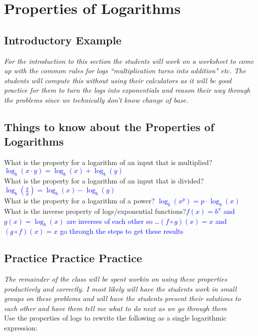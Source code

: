 \documentclass[11pt]{scrartcl}
\theoremstyle{definition}
\begin{document}

\section*{Properties of Logarithms}
\subsection*{Introductory Example}
\textit{For the introduction to this section the students will work on a worksheet to come up with the common rules for logs ``multiplication turns into addition" etc. The students will compute this without using their calculators as it will be good practice for them to turn the logs into exponentials and reason their way through the problems since we technically don't know change of base.}

\subsection*{Things to know about the Properties of Logarithms}
What is the property for a logarithm of an input that is multiplied? \textcolor{blue}{$\log_b(x \cdot y)=\log_b(x)+\log_b(y)$}  \\
What is the property for a logarithm of an input that is divided? \textcolor{blue}{$\log_b \left(\frac{x}{y}\right) = \log_b(x)-\log_b(y)$} \\
What is the property for a logarithm of a power? \textcolor{blue}{$\log_b(x^p)=p \cdot \log_b(x)$ } \\
What is the inverse property of logs/exponential functions?\textcolor{blue}{$f(x)=b^x$ and $g(x)= \log_b(x)$ are inverses of each other so \ldots $(f \circ g)(x)=x$ and $(g \circ f)(x)=x$ go through the steps to get these results}\\

\subsection*{Practice Practice Practice}
\textit{The remainder of the class will be spent workin on using these properties productively and correctly. I most likely will have the students work in small groups on these problems and will have the students present their solutions to each other and have them tell me what to do next as we go through them}\\

\noindent
Use the properties of logs to rewrite the following as a single logarithmic expression:\\
\end{document}
